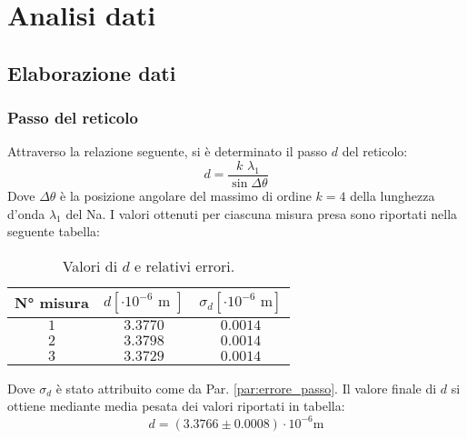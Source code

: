 \documentclass[]{article}
\let\oldsection\section%
\renewcommand{\section}{%
	\renewcommand{\theequation}{\thesection.\arabic{equation}}%
	\oldsection}%
\let\oldsubsection\subsection%
\renewcommand{\subsection}{%
	\renewcommand{\theequation}{\thesubsection.\arabic{equation}}%
	\oldsubsection}%
\begin{document}
    \section{Analisi dati}
    \subsection{Elaborazione dati}
    \subsubsection{Passo del reticolo}
    Attraverso la relazione seguente, si è determinato il passo $d$ del reticolo: 
    \begin{equation}
        \label{passo}
        d = \frac{k \, \, \lambda_1}{\sin{\Delta\theta}}
    \end{equation}
    Dove $\Delta\theta$ è la posizione angolare del massimo di ordine $k=4$ della lunghezza d'onda $\lambda_1$ del Na.
    I valori ottenuti per ciascuna misura presa sono riportati nella seguente tabella:
    \begin{table} [H]
        \centering
        \begin{tabular}{||c|c|c||}
            \hline
            N° misura & $d [\cdot 10^{-6}\text{ m }] $ & $ \sigma_d [\cdot 10^{-6}\text{ m}] $\\
            \hline \hline
            $ 1 $ & $ 3.3770 $ & $ 0.0014 $ \\\hline
            $ 2 $ & $ 3.3798 $ & $ 0.0014 $ \\\hline
            $ 3 $ & $ 3.3729 $ & $ 0.0014 $ \\\hline
        \end{tabular}
        \caption{Valori di $d$ e relativi errori.}
        \label{d-values}
    \end{table}
    Dove $\sigma_d$ è stato attribuito come da Par. \ref{par:errore_passo}.
    Il valore finale di $d$ si ottiene mediante media pesata dei valori riportati in tabella:
    \begin{equation}
        \label{d-value}
        d = (3.3766 \pm 0.0008 ) \cdot 10^{-6} \text{m}
    \end{equation}
\end{document}

